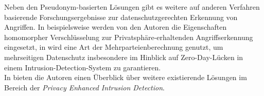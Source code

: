 
Neben den Pseudonym-basierten Lösungen gibt es weitere auf anderen Verfahren basierende Forschungsergebnisse zur datenschutzgerechten Erkennung von Angriffen. In \cite{park2007ppids} beispielsweise werden von den Autoren die Eigenschaften homomorpher Verschlüsselung zur Privatsphäre-erhaltenden Angriffserkennung eingesetzt, in \cite{niksefat2013zids} wird eine Art der Mehrparteienberechnung genutzt, um mehrseitigen Datenschutz insbesondere im Hinblick auf Zero-Day-Lücken in einem Intrusion-Detection-System zu garantieren.\\
In \cite{niksefat2017privacy} bieten die Autoren einen Überblick über weitere existierende Lösungen im Bereich der \textit{Privacy Enhanced Intrusion Detection}.










\endinput

%
%








\todo{
Wo passen Abschnitte zu folgenden Stichworten hin?
- Verschiedene Datenarten: Identifizierend, Traffic, nicht relevant, ...
- Grundlegende Definition Insiderangriff
}

Liest man von erfolgreichen Angriffen auf Unternehmensnetzwerke, so ist die implizite Annahme von außenstehenden, unternehmensfremden Angreifern weit verbreitet. Doch häufig sind die Angreifer bereits im Netzwerk ansässig. Es handelt sich um (ehemalige) Mitarbeiter oder Personen mit legitimem Zugriff auf das Netzwerk, wie Geschäftspartnern oder Kunden. 

